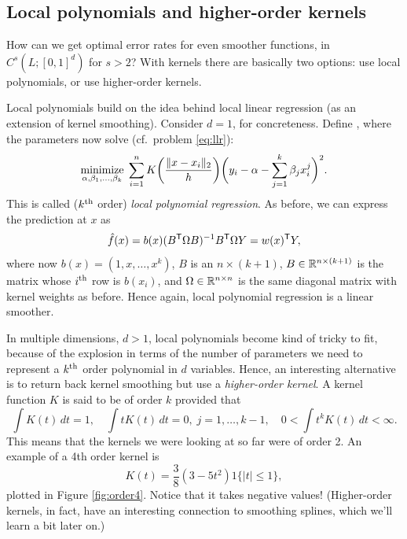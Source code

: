 \documentclass{article}
\begin{document}
\subsection{Local polynomials and higher-order kernels}

How can we get optimal error rates for even smoother functions, in $C^s(L;
[0,1]^d)$ for $s > 2$? With kernels there are basically two options: use
local polynomials, or use higher-order kernels.

Local polynomials build on the idea behind local linear regression (as an
extension of kernel smoothing). Consider $d=1$, for concreteness. Define
, where the
parameters  now solve 
(cf.\ problem \eqref{eq:llr}):
\begin{equation}
\label{eq:local_poly}
\mathop{\mathrm{minimize}}_{\alpha, \beta_1,\dots,\beta_k} \; \sum_{i=1}^n K\bigg(
\frac{\|x-x_i\|_2}{h} \bigg) \bigg(y_i - \alpha - \sum_{j=1}^k \beta_j x_i^j 
\bigg)^2. 
\end{equation}
This is called ($k^{\text{th}}$ order) \emph{local polynomial regression}. As before, we 
can express the prediction at $x$ as
\[
\hat{f}(x) = b(x)(B^{\mathsf{T}} \Omega B)^{-1} B^{\mathsf{T}} \Omega Y = w(x)^{\mathsf{T}} Y,
\]
where now $b(x) = (1,x,\dots,x^k)$, $B$ is an $n \times (k+1)$, $B \in \mathbb{R}^{n 
  \times (k+1)}$ is the matrix whose $i^{\text{th}}$ row is $b(x_i)$, and $\Omega \in
\mathbb{R}^{n \times n}$ is the same diagonal matrix with kernel weights as
before. Hence again, local polynomial regression is a linear smoother. 

In multiple dimensions, $d>1$, local polynomials become kind of tricky to fit,
because of the explosion in terms of the number of parameters we need to
represent a $k^{\text{th}}$ order polynomial in $d$ variables. Hence, an interesting
alternative is to return back kernel smoothing but use a \emph{higher-order 
  kernel}. A kernel function $K$ is said to be of order $k$ provided that
\[ 
\int K(t) \, dt = 1, \quad
\int t K(t) \, dt = 0, \; j=1,\dots,k-1, \quad
0 < \int t^k K(t) \, dt < \infty.
\]
This means that the kernels we were looking at so far were of order 2. An
example of a 4th order kernel is 
\[
K(t) = \frac{3}{8}(3-5t^2) 1\{|t|\leq 1\}, 
\]
plotted in Figure \ref{fig:order4}. Notice that it takes negative values! 
(Higher-order kernels, in fact, have an interesting connection to smoothing
splines, which we'll learn a bit later on.)
\end{document}

